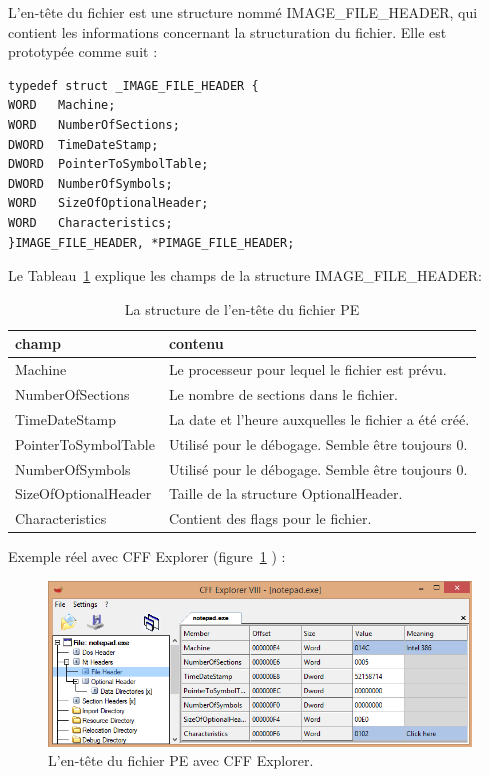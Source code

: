 L'en-tête du fichier est une structure nommé IMAGE\_FILE\_HEADER, qui contient les informations
concernant la structuration du fichier. Elle est prototypée comme suit :
\begin{lstlisting}
typedef struct _IMAGE_FILE_HEADER {
WORD   Machine;                       
WORD   NumberOfSections;
DWORD  TimeDateStamp;
DWORD  PointerToSymbolTable;
DWORD  NumberOfSymbols;
WORD   SizeOfOptionalHeader;
WORD   Characteristics;
}IMAGE_FILE_HEADER, *PIMAGE_FILE_HEADER;
\end{lstlisting}
Le Tableau~\ref{tab1} explique les champs de la structure IMAGE\_FILE\_HEADER:
\begin{table}[h]
\begin{tabular}{|p{4.5cm}|p{10.5cm}|}
\hline \textbf{champ} &  \textbf{contenu}\\
\hline Machine & Le processeur pour lequel le fichier est prévu.\\
\hline NumberOfSections & Le nombre de sections dans le fichier.\\
\hline TimeDateStamp & La date et l'heure auxquelles le fichier a été créé.\\
\hline PointerToSymbolTable & Utilisé pour le débogage. Semble être toujours 0.\\
\hline NumberOfSymbols & Utilisé pour le débogage. Semble être toujours 0.\\
\hline SizeOfOptionalHeader & Taille de la structure OptionalHeader.\\
\hline Characteristics & Contient des flags pour le fichier.\\
\hline
\end{tabular}
\caption{La structure de l'en-tête du fichier PE}
\label{tab1}
\end{table}
Exemple réel avec CFF Explorer (figure~\ref{fig :pic3} ) :
\begin{figure}[H]
\begin{center}
\includegraphics[scale=0.7]{Figures/pic3.PNG}
\caption{ L'en-tête du fichier PE avec CFF Explorer.}
\label{fig :pic3} 
\end{center}
\end{figure}

